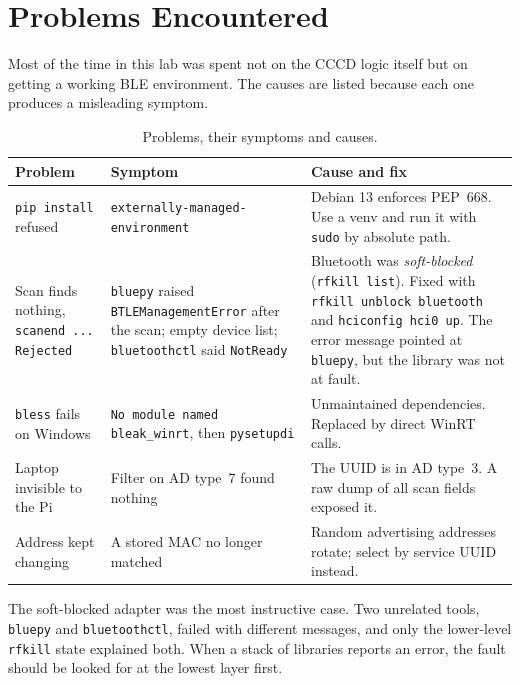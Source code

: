 \documentclass[11pt,a4paper]{article}
\begin{document}
\section{Problems Encountered}

Most of the time in this lab was spent not on the CCCD logic itself but on
getting a working BLE environment. The causes are listed because each one
produces a misleading symptom.

\begin{table}[h]
\centering
\caption{Problems, their symptoms and causes.}
\begin{tabular}{@{}p{3.2cm}p{4.8cm}p{5.8cm}@{}}
\toprule
Problem & Symptom & Cause and fix \\
\midrule
\texttt{pip install} refused &
  \texttt{externally-managed-environment} &
  Debian 13 enforces PEP~668. Use a venv and run it with
  \texttt{sudo} by absolute path. \\
Scan finds nothing, \texttt{scanend ... Rejected} &
  \texttt{bluepy} raised \texttt{BTLEManagementError} after the scan; empty
  device list; \texttt{bluetoothctl} said \texttt{NotReady} &
  Bluetooth was \emph{soft-blocked} (\texttt{rfkill list}). Fixed with
  \texttt{rfkill unblock bluetooth} and \texttt{hciconfig hci0 up}. The error
  message pointed at \texttt{bluepy}, but the library was not at fault. \\
\texttt{bless} fails on Windows &
  \texttt{No module named bleak\_winrt}, then \texttt{pysetupdi} &
  Unmaintained dependencies. Replaced by direct WinRT calls. \\
Laptop invisible to the Pi &
  Filter on AD type~7 found nothing &
  The UUID is in AD type~3. A raw dump of all scan fields exposed it. \\
Address kept changing &
  A stored MAC no longer matched &
  Random advertising addresses rotate; select by service UUID instead. \\
\bottomrule
\end{tabular}
\end{table}

The soft-blocked adapter was the most instructive case. Two unrelated tools,
\texttt{bluepy} and \texttt{bluetoothctl}, failed with different messages, and
only the lower-level \texttt{rfkill} state explained both. When a stack of
libraries reports an error, the fault should be looked for at the lowest layer
first.

\end{document}
